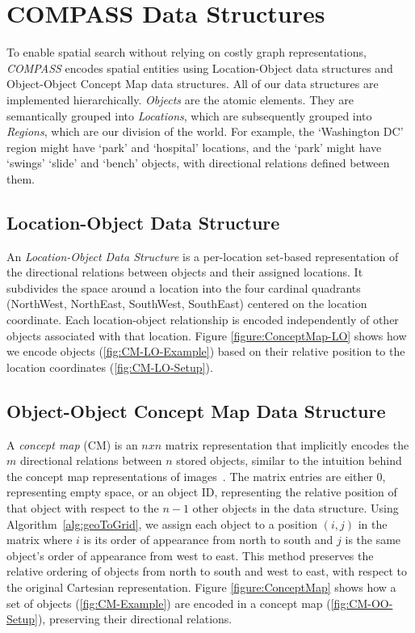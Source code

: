 \section{COMPASS Data Structures}
\label{section:data_structures}
To enable spatial search without relying on costly graph representations, \emph{COMPASS} encodes spatial entities using Location-Object data structures and Object-Object Concept Map data structures. 
All of our data structures are implemented hierarchically. \textit{Objects} are the atomic elements. They are semantically grouped into \textit{Locations}, which are subsequently grouped into \textit{Regions}, which are our division of the world. For example, the `Washington DC' region might have `park' and `hospital' locations, and the `park' might have `swings' `slide' and `bench' objects, with directional relations defined between them. 

\subsection{Location-Object Data Structure}
An \textit{Location-Object Data Structure} is a per-location set-based representation of the directional relations between objects and their assigned locations.
It subdivides the space around a location into the four cardinal quadrants (NorthWest, NorthEast, SouthWest, SouthEast) centered on the location coordinate.
Each location-object relationship is encoded independently of other objects associated with that location.
Figure \ref{figure:ConceptMap-LO} shows how we encode objects (\ref{fig:CM-LO-Example}) based on their relative position to the location coordinates (\ref{fig:CM-LO-Setup}).


\subsection{Object-Object Concept Map Data Structure}

A \textit{concept map} (CM) is an $nxn$ matrix representation that implicitly encodes the $m$ directional relations between $n$ stored objects, similar to the intuition behind the concept map representations of images~\cite{Xu2010}.
The matrix entries are either $0$, representing empty space, or an object ID, representing the relative position of that object with respect to the $n-1$ other objects in the data structure.
Using Algorithm~\ref{alg:geoToGrid}, we assign each object to a position $(i,j)$ in the matrix where $i$ is its order of appearance from north to south and $j$ is the same object's order of appearance from west to east.
This method preserves the relative ordering of objects from north to south and west to east, with respect to the original Cartesian representation.
Figure \ref{figure:ConceptMap} shows how a set of objects (\ref{fig:CM-Example}) are encoded in a concept map (\ref{fig:CM-OO-Setup}), preserving their directional relations. 



